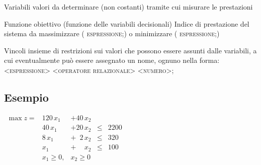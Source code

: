 \documentclass{beamer}
\newcommand{\noun}[1]{\textsc{#1}}
\def\lyxframeend{} %
\begin{document}
\lyxframeend{}
\begin{block}{Variabili}
valori da determinare (non costanti) tramite cui misurare le prestazioni
\end{block}

\begin{block}{Funzione obiettivo (funzione delle variabili decisionali)}
Indice di prestazione del sistema da massimizzare (\noun{\structure{\noun{MAX =}} espressione};)
o minimizzare (\noun{\structure{\noun{MIN =}} espressione};)
\end{block}

\begin{block}{Vincoli}
insieme di restrizioni sui valori che possono essere assunti dalle variabili, a cui eventualmente pu\`o essere assegnato un
nome, ognuno nella forma:\\
\noun{<espressione> <operatore relazionale> <numero}>;
\end{block}

\lyxframeend{}\subsection{Esempio}

\begin{center}
$\begin{array}{rrrcr}
\max z= & 120\,x_{1} & +40\,x_{2}\\
 & 40\,x_{1} & +                    20\,x_{2} & \leq & 2200\\
 &  8\,x_{1} & +          \phantom{0}2\,x_{2} & \leq &  320\\
 &     x_{1} & +\phantom{0}\phantom{0}\,x_{2} & \leq &  100\\
 & x_{1} \geq 0, & x_{2} \geq 0
\end{array}$
\par\end{center}

\end{document}
